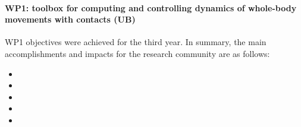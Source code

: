 

\paragraph*{WP1: toolbox for computing and controlling dynamics of whole-body
  movements with contacts (UB)}

WP1 objectives were achieved for the third year.  In summary, the main
accomplishments and impacts for the research community are as follows:

\begin{itemize}

\item 

\item 

\item 

\item 

\item 
 
 \end{itemize}

